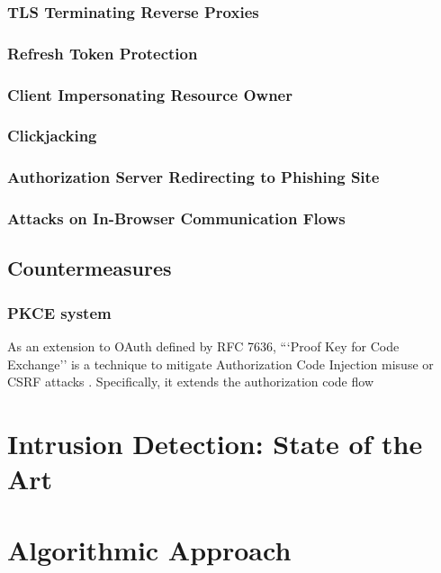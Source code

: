 \documentclass[
    fontsize=12pt,
    headings=small,
    parskip=half,           %
    bibliography=totoc,
    numbers=noenddot,       %
    open=any,               %
    ]{scrreprt}
\begin{document}
\subsection{TLS Terminating Reverse Proxies}

\subsection{Refresh Token Protection}

\subsection{Client Impersonating Resource Owner}

\subsection{Clickjacking}

\subsection{Authorization Server Redirecting to Phishing Site}

\subsection{Attacks on In-Browser Communication Flows}

\section{Countermeasures}
\subsection{PKCE system}
As an extension to OAuth defined by RFC 7636, ```Proof Key for Code Exchange''
is a technique to mitigate Authorization Code Injection misuse or CSRF attacks
\cite{bradley2015rfc}. Specifically, it extends the authorization code flow 

\chapter{Intrusion Detection: State of the Art}

\chapter{Algorithmic Approach}
\end{document}
